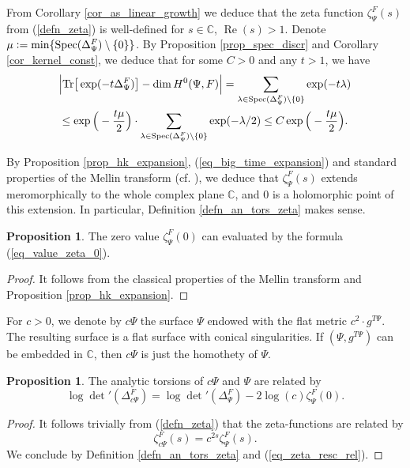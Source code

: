 \documentclass[12pt]{article}
\numberwithin{equation}{section}
\theoremstyle{theorem}
\theoremstyle{definition}
\newtheorem{prop}[thm]{Proposition}
\theoremstyle{remark}
\newcommand{\comp}{\mathbb{C}}
\newcommand{\spec}{{\rm{Spec}}}
\newcommand{\laplcomp}{\Delta}
\newcommand{\tr}[1]{{\rm{Tr}} \big[ #1 \big]}
\renewcommand{\Re}{\operatorname{Re}}
\begin{document}
	 	From Corollary \ref{cor_as_linear_growth} we deduce that the zeta function $\zeta_{\Psi}^{F}(s)$ from (\ref{defn_zeta}) is well-defined for $s \in \comp$, $\Re(s) > 1$. 
	 	Denote $\mu := \min\{ \spec(\laplcomp_{\Psi}^{F}) \setminus \{0\} \}$. 
	 	By Proposition \ref{prop_spec_discr} and Corollary \ref{cor_kernel_const}, we deduce that for some $C > 0$ and any $t > 1$, we have 
	 	\begin{multline}\label{eq_big_time_expansion}
	 		\Big| \tr{\exp(-t \laplcomp_{\Psi}^{F})} - \dim H^0(\Psi, F) \Big| 
	 		=
	 		\sum_{\lambda \in \spec(\laplcomp_{\Psi}^{F}) \setminus \{0\}} \exp(-t \lambda)
	 		\\
	 		\leq 
	 		\exp \Big(- \frac{t \mu}{2} \Big)
	 		\cdot
	 		\sum_{\lambda \in \spec(\laplcomp_{\Psi}^{F}) \setminus \{0\}} \exp(-\lambda/2)
	 		\leq
	 		C \exp \Big(- \frac{t \mu}{2} \Big).
	 	\end{multline}
	 	\par By Proposition \ref{prop_hk_expansion}, (\ref{eq_big_time_expansion}) and standard properties of the Mellin transform (cf. \cite[Lemma 9.35]{BGV}), we deduce that $\zeta_{\Psi}^{F}(s)$ extends meromorphically to the whole complex plane $\comp$, and $0$ is a holomorphic point of this extension. In particular, Definition \ref{defn_an_tors_zeta} makes sense.
	 	\begin{prop}\label{prop_zeta_zero_val}
	 		The zero value $\zeta_{\Psi}^{F}(0)$ can evaluated by the formula (\ref{eq_value_zeta_0}).
	 	\end{prop}
	 	\begin{proof}
	 		It follows from the classical properties of the Mellin transform and Proposition \ref{prop_hk_expansion}.
	 	\end{proof}
	 	\par For $c > 0$, we denote by $c \Psi$ the surface $\Psi$ endowed with the flat metric $c^2 \cdot g^{T \Psi}$. 
	 	The resulting surface is a flat surface with conical singularities.
	 	If $(\Psi, g^{T \Psi})$ can be embedded in $\comp$, then $c \Psi$ is just the homothety of $\Psi$. 
	 	\begin{prop}\label{prop_an_tors_rescaling}
	 		The analytic torsions of $c \Psi$ and $\Psi$ are related by
	 		\begin{equation}
	 			\log \det{}'(\laplcomp_{c \Psi}^{F}) = \log \det{}'(\laplcomp_{\Psi}^{F}) - 2 \log(c) \zeta_{\Psi}^{F}(0).
	 		\end{equation}
	 	\end{prop}
	 	\begin{proof}
	 		It follows trivially from (\ref{defn_zeta}) that the zeta-functions are related by
	 		\begin{equation}\label{eq_zeta_resc_rel}
	 			\zeta_{c \Psi}^{F}(s) = c^{2s} \zeta_{\Psi}^{F}(s).
	 		\end{equation}
	 		We conclude by Definition \ref{defn_an_tors_zeta} and (\ref{eq_zeta_resc_rel}).
	 	\end{proof}
	 
\end{document}
